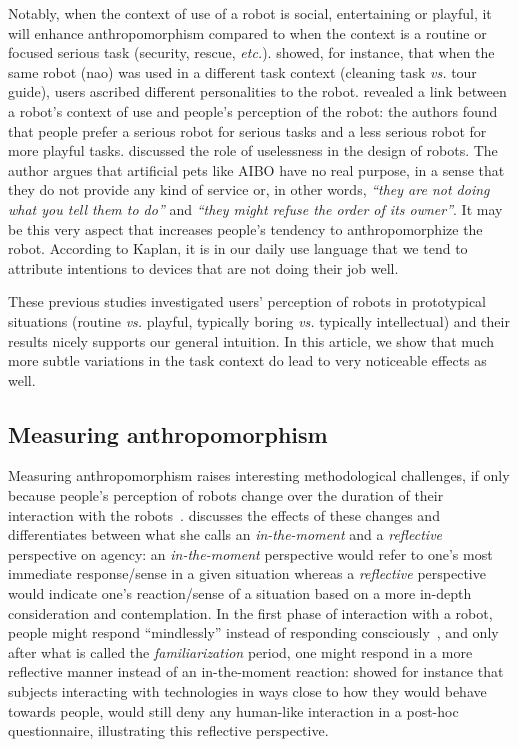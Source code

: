 \documentclass[lettersize, noapacite, twoside, HRI]{apa_HRI}
\newcommand{\etc}{\textit{etc.}\xspace}
\newcommand{\vs}{\textit{vs.}\xspace}
\begin{document}
Notably, when the context of use of a robot is social, entertaining or playful,
it will enhance anthropomorphism compared to when the context is a routine or
focused serious task (security, rescue, \etc).  \citet{joosse_what_2013} showed,
for instance, that when the same robot ({\sc nao}) was used in a different task
context (cleaning task \vs tour guide), users ascribed different personalities
to the robot. \citet{goetz_cooperation_2002} revealed a link between a robot's
context of use and people's perception of the robot: the authors found that
people prefer a serious robot for serious tasks and a less serious robot for
more playful tasks. \citet{kaplan_free_2000} discussed the role of uselessness
in the design of robots. The author argues that artificial pets like AIBO have
no real purpose, in a sense that they do not provide any kind of service or, in
other words, \textit{``they are not doing what you tell them to do''} and
\textit{``they might refuse the order of its owner''}. It may be this very
aspect that increases people's tendency to anthropomorphize the robot. According
to Kaplan, it is in our daily use language that we tend to attribute intentions
to devices that are not doing their job well.

These previous studies investigated users' perception of robots in
prototypical situations (routine \vs playful, typically boring \vs typically
intellectual) and their results nicely supports our general intuition.
In this article, we show that much more subtle variations in the task context do
lead to very noticeable effects as well.

\subsection*{Measuring anthropomorphism}

Measuring anthropomorphism raises
interesting methodological challenges, if only because people's perception of
robots change over the duration of their interaction with the
robots~\citep{lemaignan2014dynamics}. \citet{takayama_perspectives_2012}
discusses the effects of these changes and differentiates between what she calls
an \emph{in-the-moment} and a \emph{reflective} perspective on agency: an
\emph{in-the-moment} perspective would refer to one's most immediate
response/sense in a given situation whereas a \emph{reflective} perspective would
indicate one's reaction/sense of a situation based on a more in-depth
consideration and contemplation.  In the first phase of interaction with a
robot, people might respond ``mindlessly'' instead of responding
consciously~\citep{nass_machines_2000}, and only after what is called the
\emph{familiarization} period, one might respond in a more reflective manner
instead of an in-the-moment reaction: \citet{reeves_media_1996} showed for
instance that subjects interacting with technologies in ways close to how they
would behave towards people, would still deny any human-like interaction in a post-hoc
questionnaire, illustrating this reflective perspective.
\end{document}
